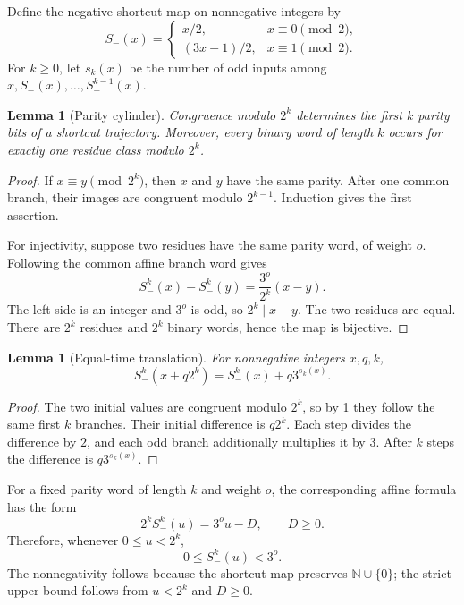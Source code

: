 \documentclass[11pt]{article}
\newtheorem{lemma}[theorem]{Lemma}
\theoremstyle{definition}
\theoremstyle{remark}
\newcommand{\N}{\mathbb N}
\newcommand{\Sm}{S_{-}}
\begin{document}
Define the negative shortcut map on nonnegative integers by
\[
 \Sm(x)=\begin{cases}
 x/2,&x\equiv0\pmod2,\\
 (3x-1)/2,&x\equiv1\pmod2.
 \end{cases}                                          \tag{4.1}
\]
For $k\ge0$, let $s_k(x)$ be the number of odd inputs among
$x,\Sm(x),\ldots,\Sm^{k-1}(x)$.

\begin{lemma}[Parity cylinder]\label{lem:parity-cylinder}
Congruence modulo $2^k$ determines the first $k$ parity bits of a shortcut
trajectory.  Moreover, every binary word of length $k$ occurs for exactly one
residue class modulo $2^k$.
\end{lemma}

\begin{proof}
If $x\equiv y\pmod{2^k}$, then $x$ and $y$ have the same parity.  After one
common branch, their images are congruent modulo $2^{k-1}$.  Induction gives
the first assertion.

For injectivity, suppose two residues have the same parity word, of weight
$o$.  Following the common affine branch word gives
\[
 \Sm^k(x)-\Sm^k(y)=\frac{3^o}{2^k}(x-y).
\]
The left side is an integer and $3^o$ is odd, so $2^k\mid x-y$.  The two
residues are equal.  There are $2^k$ residues and $2^k$ binary words, hence
the map is bijective.
\end{proof}

\begin{lemma}[Equal-time translation]\label{lem:equal-time}
For nonnegative integers $x,q,k$,
\[
 \Sm^k(x+q2^k)=\Sm^k(x)+q3^{s_k(x)}.                 \tag{4.2}
\]
\end{lemma}

\begin{proof}
The two initial values are congruent modulo $2^k$, so by
\cref{lem:parity-cylinder} they follow the same first $k$ branches.  Their
initial difference is $q2^k$.  Each step divides the difference by $2$, and
each odd branch additionally multiplies it by $3$.  After $k$ steps the
difference is $q3^{s_k(x)}$.
\end{proof}

For a fixed parity word of length $k$ and weight $o$, the corresponding
affine formula has the form
\[
 2^k\Sm^k(u)=3^o u-D,\qquad D\ge0.                   \tag{4.3}
\]
Therefore, whenever $0\le u<2^k$,
\[
 0\le\Sm^k(u)<3^o.                                   \tag{4.4}
\]
The nonnegativity follows because the shortcut map preserves
$\N\cup\{0\}$; the strict upper bound follows from $u<2^k$ and $D\ge0$.
\end{document}
